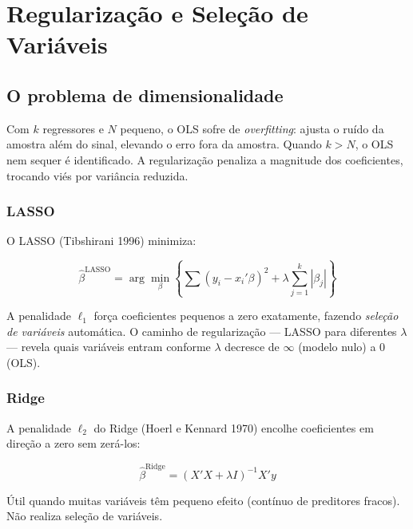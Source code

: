 \chapter{Regularização e Seleção de Variáveis}
\label{cap:regularizacao}

\section{O problema de dimensionalidade}

Com $k$ regressores e $N$ pequeno, o OLS sofre de \emph{overfitting}: ajusta
o ruído da amostra além do sinal, elevando o erro fora da amostra. Quando
$k > N$, o OLS nem sequer é identificado. A regularização penaliza a
magnitude dos coeficientes, trocando viés por variância reduzida.

\subsection*{LASSO}

O LASSO (Tibshirani 1996) minimiza:

\[
  \hat\beta^{\mathrm{LASSO}} = \arg\min_\beta \left\{ \sum(y_i - x_i'\beta)^2
  + \lambda \sum_{j=1}^k |\beta_j| \right\}
\]

A penalidade $\ell_1$ força coeficientes pequenos a zero exatamente, fazendo
\emph{seleção de variáveis} automática. O caminho de regularização — LASSO
para diferentes $\lambda$ — revela quais variáveis entram conforme $\lambda$
decresce de $\infty$ (modelo nulo) a 0 (OLS).

\subsection*{Ridge}

A penalidade $\ell_2$ do Ridge (Hoerl e Kennard 1970) encolhe coeficientes
em direção a zero sem zerá-los:

\[
  \hat\beta^{\mathrm{Ridge}} = (X'X + \lambda I)^{-1} X'y
\]

Útil quando muitas variáveis têm pequeno efeito (contínuo de preditores
fracos). Não realiza seleção de variáveis.

